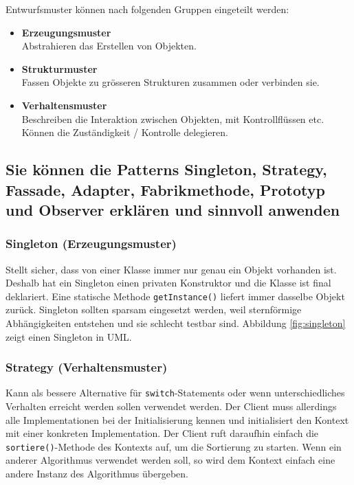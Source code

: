 Entwurfsmuster können nach folgenden Gruppen eingeteilt werden:
\begin{itemize}
  \item \textbf{Erzeugungsmuster} \\
  Abstrahieren das Erstellen von Objekten.
  \item \textbf{Strukturmuster} \\
  Fassen Objekte zu grösseren Strukturen zusammen oder verbinden sie.
  \item \textbf{Verhaltensmuster} \\
  Beschreiben die Interaktion zwischen Objekten, mit Kontrollflüssen etc. Können die Zuständigkeit / Kontrolle delegieren.
\end{itemize}

\newpage

\subsection{Sie können die Patterns Singleton, Strategy, Fassade, Adapter, Fabrikmethode, Prototyp und Observer erklären und sinnvoll anwenden}
\label{sec:patterns}

\subsubsection{Singleton (Erzeugungsmuster)}
Stellt sicher, dass von einer Klasse immer nur genau ein Objekt vorhanden ist. Deshalb hat ein Singleton einen privaten Konstruktor und die Klasse ist final deklariert. Eine statische Methode \texttt{getInstance()} liefert immer dasselbe Objekt zurück. Singleton sollten sparsam eingesetzt werden, weil sternförmige Abhängigkeiten entstehen und sie schlecht testbar sind. Abbildung \ref{fig:singleton} zeigt einen Singleton in UML.
    

\subsubsection{Strategy (Verhaltensmuster)}
\label{sec:strategypattern}
Kann als bessere Alternative für \texttt{switch}-Statements oder wenn unterschiedliches Verhalten erreicht werden sollen verwendet werden. Der Client muss allerdings alle Implementationen bei der Initialisierung kennen und initialisiert den Kontext mit einer konkreten Implementation. Der Client ruft daraufhin einfach die \texttt{sortiere()}-Methode des Kontexts auf, um die Sortierung zu starten. Wenn ein anderer Algorithmus verwendet werden soll, so wird dem Kontext einfach eine andere Instanz des Algorithmus übergeben.


